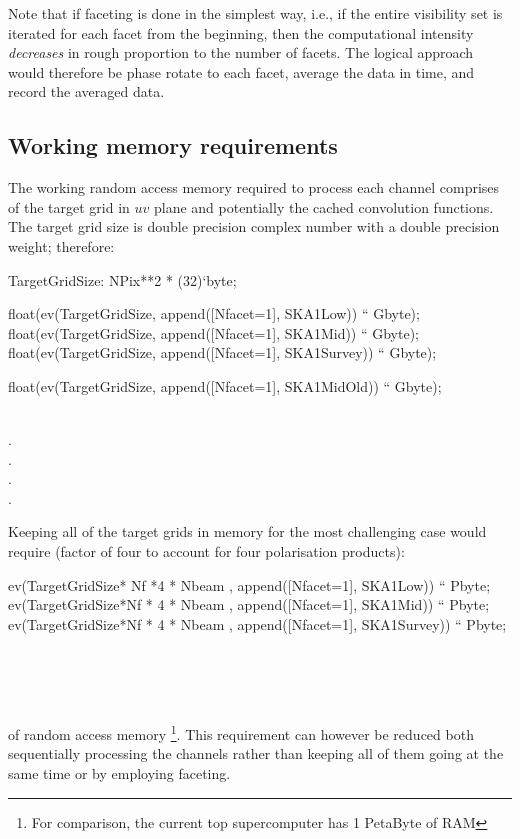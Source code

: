 \documentclass[useAMS,usenatbib,referee]{article}
\begin{document}
Note that if faceting is done in the simplest way, i.e., if the entire
visibility set is iterated for each facet from the beginning, then the
computational intensity \emph{decreases} in rough proportion to the
number of facets. The logical approach would therefore be phase rotate
to each facet, average the data in time, and record the averaged data. 

\subsection{Working memory requirements}

The working random access memory required to process each channel
comprises of the target grid in $uv$ plane and potentially the cached
convolution functions. The target grid size is double precision
complex number with a double precision weight; therefore:

\begin{maxima}[]
TargetGridSize: NPix**2 * (32)`byte;

float(ev(TargetGridSize, append([Nfacet=1], SKA1Low)) `` Gbyte);
float(ev(TargetGridSize, append([Nfacet=1], SKA1Mid)) `` Gbyte);
float(ev(TargetGridSize, append([Nfacet=1], SKA1Survey)) `` Gbyte);

float(ev(TargetGridSize, append([Nfacet=1], SKA1MidOld)) `` Gbyte);

\maximaoutput*
{}\; \\
.\; \\
.\; \\
.\; \\
.\; \\
\end{maxima}

Keeping all of the target grids in memory for the most challenging
case would require (factor of four to account for four polarisation
products):
\begin{maxima}[]
ev(TargetGridSize* Nf *4 * Nbeam  , append([Nfacet=1], SKA1Low)) `` Pbyte;
ev(TargetGridSize*Nf * 4 * Nbeam , append([Nfacet=1], SKA1Mid)) `` Pbyte;
ev(TargetGridSize*Nf * 4 * Nbeam , append([Nfacet=1], SKA1Survey)) `` Pbyte;

\maximaoutput*
{}\; \\
\; \\
\; \\
\end{maxima}
of random access memory \footnote{For comparison, the current top supercomputer has 1
  PetaByte of RAM}. This requirement can however be reduced both
sequentially processing the channels rather than keeping all of them
going at the same time or by employing faceting.
\end{document}
